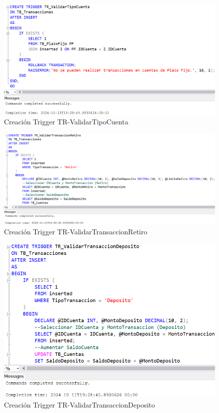\begin{figure}[H]
  \centering
  \includegraphics[scale = 0.4]{Imagenes/SQL/3.Triggers/TR_ValidarTipoCuenta.png}
  \caption{Creación Trigger TR-ValidarTipoCuenta}
\end{figure}

\begin{figure}[H]
  \centering
  \includegraphics[scale = 0.3]{Imagenes/SQL/3.Triggers/TR_ValidarTransaccionRetiro.png}
  \caption{Creación Trigger TR-ValidarTransaccionRetiro}
\end{figure}

\begin{figure}[H]
  \centering
  \includegraphics[scale = 0.4]{Imagenes/SQL/3.Triggers/TR_ValidarTransaccionDeposito.png}
  \caption{Creación Trigger TR-ValidarTransaccionDeposito}
\end{figure}

